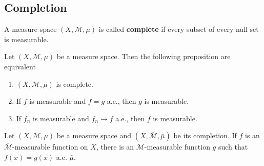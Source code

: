 \documentclass[12pt, a4paper, oneside]{book}
\begin{document}
\subsection{Completion}
\begin{definition}
    A measure space $\left(X, \mathcal{M}, \mu\right)$ is called \textbf{complete} if every subset of every null set is measurable.
\end{definition}
\begin{proposition}
    Let $\left(X,\mathcal{M},\mu\right)$ be a measure space. Then the following proposition are equivalent
    \begin{enumerate}
        \item
              $(X, \mathcal{M}, \mu)$ is complete.
        \item
              If $f$ is measurable and $f=g$ a.e., then $g$ is measurable.
        \item
              If $f_n$ is measurable and $f_n \rightarrow f$ a.e., then $f$ is measurable.
    \end{enumerate}
\end{proposition}
\begin{proposition}
    Let $(X, \mathcal{M}, \mu)$ be a measure space and $(X, \overline{\mathcal{M}}, \bar{\mu})$ be its completion. If $f$ is an $\overline{\mathcal{M}}$-measurable function on $X$, there is an $\mathcal{M}$-measurable function $g$ such that $f(x)=g(x)$ a.e. $\bar{\mu}$.
\end{proposition}
\end{document}

